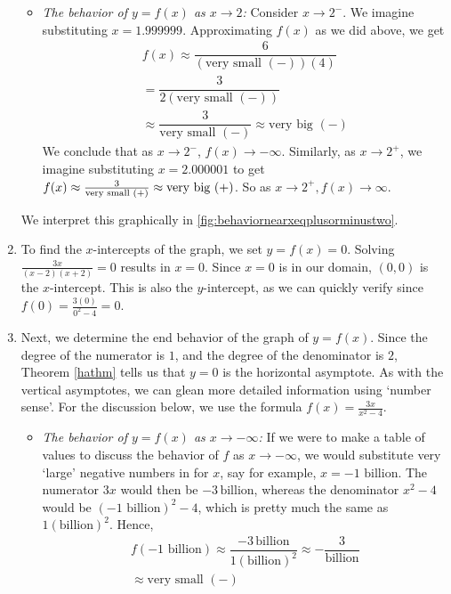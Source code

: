 \begin{ex}
\begin{enumerate}
\begin{itemize}
\item  \textit{The behavior of $y=f(x)$ as $x \rightarrow 2$:} Consider $x \rightarrow 2^{-}$. We imagine substituting $x = 1.999999$.  Approximating $f(x)$ as we did above, we get
\begin{multline*}
f(x) \approx \dfrac{6}{\left( \text{very small $(-)$}\right)(4)} \\
= \dfrac{3}{2 \left( \text{very small $(-)$}\right)} \\
\approx \dfrac{3}{\text{very small $(-)$}} \approx \text{very big $(-)$}
\end{multline*}
We conclude that as $x \rightarrow 2^{-}$, $f(x) \rightarrow -\infty$.  Similarly, as $x \rightarrow 2^{+}$, we imagine substituting $x = 2.000001$ to get $f(x) \approx \frac{3}{\text{\scriptsize very small $(+)$}} \approx \text{very big (+)}$.  So as $x \rightarrow 2^{+}, f(x) \rightarrow \infty$.
\end{itemize}

We interpret this graphically in \autoref{fig:behaviornearxeqplusorminustwo}.

\item  To find the $x$-intercepts of the graph, we set $y=f(x) = 0$.  Solving $ \frac{3x}{(x-2)(x+2)} = 0$ results in $x=0$.  Since $x=0$ is in our domain, $(0,0)$ is the $x$-intercept.   This is also the $y$-intercept, as we can quickly verify since $f(0) = \frac{3(0)}{0^2-4} = 0$.


\item  Next, we determine the end behavior of the graph of $y=f(x)$.  Since the degree of the numerator is $1$, and the degree of the denominator is $2$, Theorem \ref{hathm} tells us that $y=0$ is the horizontal asymptote.  As with the vertical asymptotes, we can glean more detailed information using `number sense'. For the discussion below, we use the formula $f(x) = \frac{3x}{x^2-4}$. 

\begin{itemize}

\item  \textit{The behavior of $y=f(x)$ as $x \rightarrow -\infty$:}  If we were to make a table of values to discuss the behavior of $f$ as $x \rightarrow -\infty$, we would substitute very `large' negative numbers in for $x$, say for example, $x = \text{$-1$ billion}$.  The numerator $3x$ would then be $-3 \, \text{billion}$, whereas the denominator $x^2-4$ would be $(\text{$-1$ billion})^2 - 4$, which is pretty much the same as  $1(\text{billion})^2$.  Hence, 
\begin{multline*}
     f\left(\text{$-1$ billion}\right) \approx \dfrac{-3 \, \text{billion}}{1(\text{billion})^2} \approx - \dfrac{3}{\text{billion}} \\
     \approx \text{very small $(-)$}
\end{multline*}


\end{itemize}
\end{enumerate}
\end{ex}
